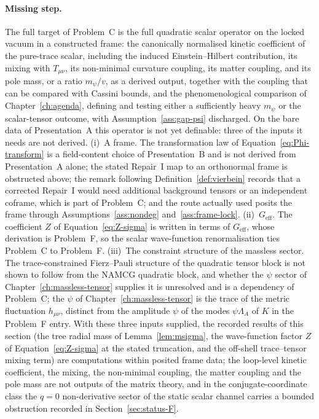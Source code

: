 \paragraph{Missing step.} The full target of Problem~C is the full quadratic scalar operator on the locked vacuum in a constructed frame: the canonically normalised kinetic coefficient of the pure-trace scalar, including the induced Einstein--Hilbert contribution, its mixing with \(T_{\mu\nu}\), its non-minimal curvature coupling, its matter coupling, and its pole mass, or a ratio \(m_\psi/v\), as a derived output, together with the coupling that can be compared with Cassini bounds, and the phenomenological comparison of Chapter~\ref{ch:agenda}, defining and testing either a sufficiently heavy \(m_\psi\) or the scalar-tensor outcome, with Assumption~\ref{ass:gap-psi} discharged. On the bare data of Presentation~A this operator is not yet definable: three of the inputs it needs are not derived. (i)~A frame. The transformation law of Equation~\eqref{eq:Phi-transform} is a field-content choice of Presentation~B and is not derived from Presentation~A alone; the stated Repair~I map to an orthonormal frame is obstructed above; the remark following Definition~\ref{def:vierbein} records that a corrected Repair~I would need additional background tensors or an independent coframe, which is part of Problem~C; and the route actually used posits the frame through Assumptions~\ref{ass:nondeg} and~\ref{ass:frame-lock}. (ii)~\(G_{\mathrm{eff}}\). The coefficient \(Z\) of Equation~\eqref{eq:Z-sigma} is written in terms of \(G_{\mathrm{eff}}\), whose derivation is Problem~F, so the scalar wave-function renormalisation ties Problem~C to Problem~F. (iii)~The constraint structure of the massless sector. The trace-constrained Fierz--Pauli structure of the quadratic tensor block is not shown to follow from the NAMCG quadratic block, and whether the \(\psi\) sector of Chapter~\ref{ch:massless-tensor} supplies it is unresolved and is a dependency of Problem~C; the \(\psi\) of Chapter~\ref{ch:massless-tensor} is the trace of the metric fluctuation \(h_{\mu\nu}\), distinct from the amplitude \(\psi\) of the modes \(\psi\Lambda_A\) of \(K\) in the Problem~F entry. With these three inputs supplied, the recorded results of this section (the tree radial mass of Lemma~\ref{lem:msigma}, the wave-function factor \(Z\) of Equation~\eqref{eq:Z-sigma} at the stated truncation, and the off-shell trace--tensor mixing term) are computations within posited frame data; the loop-level kinetic coefficient, the mixing, the non-minimal coupling, the matter coupling and the pole mass are not outputs of the matrix theory, and in the conjugate-coordinate class the \(q=0\) non-derivative sector of the static scalar channel carries a bounded obstruction recorded in Section~\ref{sec:status-F}.